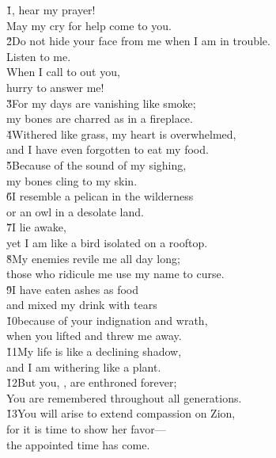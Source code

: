 \begin{poetry}
\poeml \v{1}, hear my prayer! \\
\poemll    May my cry for help come to you. \\
\poeml \v{2}Do not hide your face from me when I am in trouble. \\
\poemll    Listen to me. \\
\poeml When I call to out you, \\
\poemll    hurry to answer me! \\
\poeml \v{3}For my days are vanishing like smoke; \\
\poemll    my bones are charred as in a fireplace. \\
\poeml \v{4}Withered like grass, my heart is overwhelmed, \\
\poemll    and I have even forgotten to eat my food. \\
\poeml \v{5}Because of the sound of my sighing, \\
\poemll    my bones cling to my skin. \\
\poeml \v{6}I resemble a pelican in the wilderness \\
\poemll    or an owl in a desolate land. \\
\poeml \v{7}I lie awake, \\
\poemll    yet I am like a bird isolated on a rooftop. \\
\poeml \v{8}My enemies revile me all day long; \\
\poemll    those who ridicule me use my name to curse. \\
\poeml \v{9}I have eaten ashes as food \\
\poemll    and mixed my drink with tears \\
\poeml \v{10}because of your indignation and wrath, \\
\poemll    when you lifted and threw me away. \\
\poeml \v{11}My life is like a declining shadow, \\
\poemll    and I am withering like a plant. \\
\poeml \v{12}But you, , are enthroned forever; \\
\poemll    You are remembered throughout all generations. \\
\poeml \v{13}You will arise to extend compassion on Zion, \\
\poemll    for it is time to show her favor--- \\
\poemlll       the appointed time has come. \\

\end{poetry}
